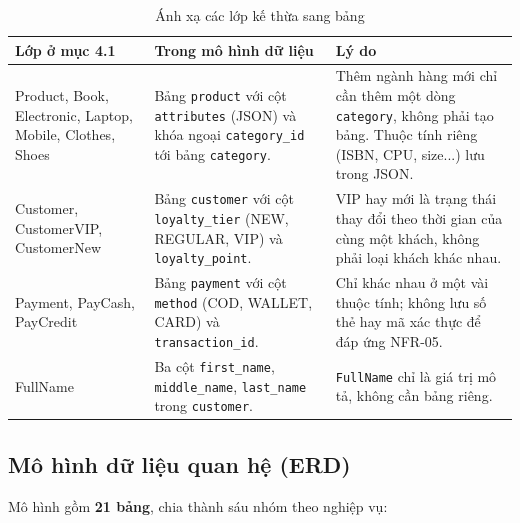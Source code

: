 \documentclass[12pt,a4paper,oneside]{report}
\begin{document}
\begin{longtable}{p{3.8cm}p{4.2cm}p{7.8cm}}
\caption{Ánh xạ các lớp kế thừa sang bảng}\\
\toprule
\textbf{Lớp ở mục 4.1} & \textbf{Trong mô hình dữ liệu} & \textbf{Lý do} \\
\midrule
\endhead
\bottomrule
\endlastfoot
Product, Book, Electronic, Laptop, Mobile, Clothes, Shoes & Bảng \texttt{product} với cột \texttt{attributes} (JSON) và khóa ngoại \texttt{category\_id} tới bảng \texttt{category}. & Thêm ngành hàng mới chỉ cần thêm một dòng \texttt{category}, không phải tạo bảng. Thuộc tính riêng (ISBN, CPU, size...) lưu trong JSON. \\
Customer, CustomerVIP, CustomerNew & Bảng \texttt{customer} với cột \texttt{loyalty\_tier} (NEW, REGULAR, VIP) và \texttt{loyalty\_point}. & VIP hay mới là trạng thái thay đổi theo thời gian của cùng một khách, không phải loại khách khác nhau. \\
Payment, PayCash, PayCredit & Bảng \texttt{payment} với cột \texttt{method} (COD, WALLET, CARD) và \texttt{transaction\_id}. & Chỉ khác nhau ở một vài thuộc tính; không lưu số thẻ hay mã xác thực để đáp ứng NFR-05. \\
FullName & Ba cột \texttt{first\_name}, \texttt{middle\_name}, \texttt{last\_name} trong \texttt{customer}. & \texttt{FullName} chỉ là giá trị mô tả, không cần bảng riêng. \\
\end{longtable}

\subsection{Mô hình dữ liệu quan hệ (ERD)}

Mô hình gồm \textbf{21 bảng}, chia thành sáu nhóm theo nghiệp vụ:
\end{document}
